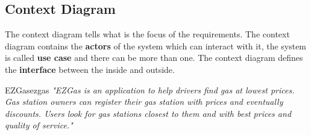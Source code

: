 \documentclass[12pt]{article}
\begin{document}
\subsection{Context Diagram}
The context diagram tells what is the focus of the requirements. The context diagram contains the \textbf{actors} of the system which can interact with it, the system is called \textbf{use case} and there can be more than one. The context diagram defines the \textbf{interface} between the inside and outside.


\begin{example}{EZGas}{ezgas}
  \emph{"EZGas is an application to help drivers find gas at lowest prices. Gas station owners can register their gas station with prices and eventually discounts. Users look for gas stations closest to them and with best prices and quality of service."}
  
  \hfill


\end{example}
\end{document}
